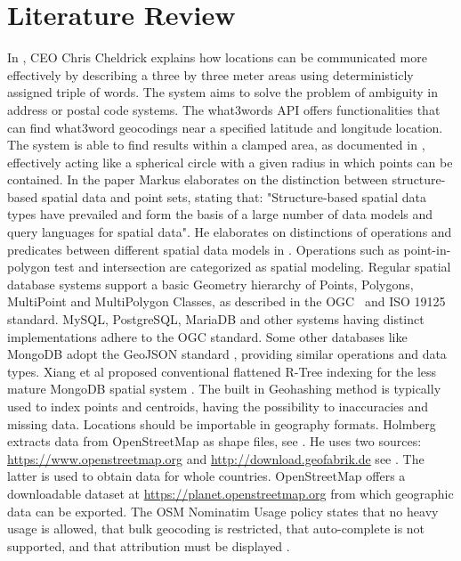 %
\section{Literature Review}
In \cite{w3w}, CEO Chris Cheldrick explains how locations can be communicated more effectively by describing a three by three meter areas using deterministicly assigned triple of words. The system aims to solve the problem of ambiguity in address or postal code systems. The what3words API offers functionalities that can find what3word geocodings near a specified latitude and longitude location. The system is able to find results within a clamped area, as documented in \cite{w3w-api}, effectively acting like a spherical circle with a given radius in which points can be contained. In the paper \cite{spatial-data-types} Markus elaborates on the distinction between structure-based spatial data and point sets, stating that: "Structure-based spatial data types have prevailed and form the basis of a large number of data models and query languages for spatial data". He elaborates on distinctions of operations and predicates between different spatial data models in \cite{geometry}. Operations such as point-in-polygon test and intersection are categorized as spatial modeling. Regular spatial database systems support a basic Geometry hierarchy of Points, Polygons, MultiPoint and MultiPolygon Classes, as described in the OGC~\cite{SFA} and ISO 19125~\cite{ISO-19125} standard. MySQL, PostgreSQL, MariaDB and other systems having distinct implementations adhere to the OGC standard. Some other databases like MongoDB adopt the GeoJSON standard \cite{MongoDB-GeoJSON}, providing similar operations and data types. Xiang et al proposed conventional flattened R-Tree indexing for the less mature MongoDB spatial system \cite{MongoDB-implementation}. The built in Geohashing method is typically used to index points and centroids, having the possibility to inaccuracies and missing data. Locations should be importable in geography formats. Holmberg extracts data from OpenStreetMap as shape files, see \cite[Chapter~6]{openstreetmap}. He uses two sources: \url{https://www.openstreetmap.org} and \url{http://download.geofabrik.de} see \cite[Chapter~7.3]{openstreetmap}. The latter is used to obtain data for whole countries. OpenStreetMap offers a downloadable dataset at \url{https://planet.openstreetmap.org} from which geographic data can be exported.
The OSM Nominatim Usage policy states that no heavy usage is allowed, that bulk geocoding is restricted, that auto-complete is not supported, and that attribution must be displayed \cite{OSM-policy}.

